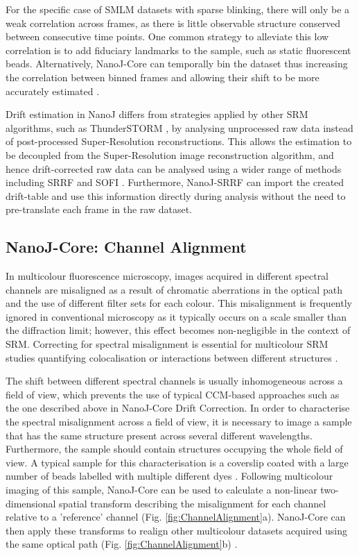  For the specific case of SMLM datasets with sparse blinking, there will only be a weak correlation across frames, as there is little observable structure conserved between consecutive time points. One common strategy to alleviate this low correlation is to add fiduciary landmarks to the sample, such as static fluorescent beads. Alternatively, NanoJ-Core can temporally bin the dataset thus increasing the correlation between binned frames and allowing their shift to be more accurately estimated \cite{mlodzianoski2011sample}. 

 Drift estimation in NanoJ differs from strategies applied by other SRM algorithms, such as ThunderSTORM \cite{ovesny2014thunderstorm}, by analysing unprocessed raw data instead of post-processed Super-Resolution reconstructions. This allows the estimation to be decoupled from the Super-Resolution image reconstruction algorithm, and hence drift-corrected raw data can be analysed using a wider range of methods including SRRF and SOFI \cite{dertinger2009fast}. Furthermore, NanoJ-SRRF can import the created drift-table and use this information directly during analysis without the need to pre-translate each frame in the raw dataset.

\subsection*{NanoJ-Core: Channel Alignment}

In multicolour fluorescence microscopy, images acquired in different spectral channels are misaligned as a result of chromatic aberrations in the optical path and the use of different filter sets for each colour. This misalignment is frequently ignored in conventional microscopy as it typically occurs on a scale smaller than the diffraction limit; however, this effect becomes non-negligible in the context of SRM\cite{erdelyi2013correcting}. Correcting for spectral misalignment is essential for multicolour SRM studies quantifying colocalisation or interactions between different structures \cite{bock2007two,van2009multicolor,niekamp2017high}. 
 
 The shift between different spectral channels is usually inhomogeneous across a field of view, which prevents the use of typical CCM-based approaches such as the one described above in NanoJ-Core Drift Correction. In order to characterise the spectral misalignment across a field of view, it is necessary to image a sample that has the same structure present across several different wavelengths. Furthermore, the sample should contain structures occupying the whole field of view. A typical sample for this characterisation is a coverslip coated with a large number of beads labelled with multiple different dyes \cite{Demmerle2017}. Following multicolour imaging of this sample, NanoJ-Core can be used to calculate a non-linear two-dimensional spatial transform describing the misalignment for each channel relative to a 'reference' channel (Fig. \ref{fig:ChannelAlignment}a). NanoJ-Core can then apply these transforms to realign other multicolour datasets acquired using the same optical path (Fig. \ref{fig:ChannelAlignment}b) \cite{arganda2006consistent,annibale2012identification}. 
 
